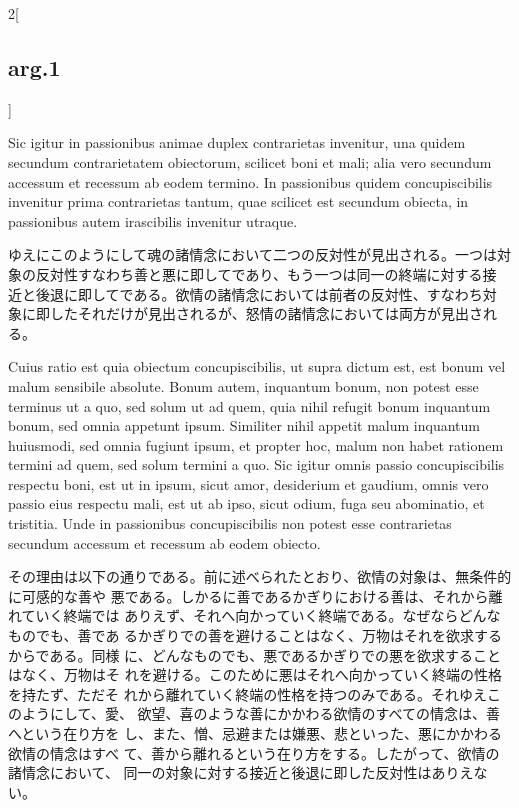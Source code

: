 \documentclass[paper=a4paper,fontsize=10pt,jafontsize=9pt,titlepage]{jlreq}
\begin{document}
\begin{paracol}{2}[\subsection{arg.1}]
\switchcolumn*

Sic igitur in passionibus animae duplex
contrarietas invenitur, una quidem secundum contrarietatem obiectorum,
scilicet boni et mali; alia vero secundum accessum et recessum ab eodem
termino. In passionibus quidem concupiscibilis invenitur prima
contrarietas tantum, quae scilicet est secundum obiecta, in passionibus
autem irascibilis invenitur utraque.

\switchcolumn

ゆえにこのようにして魂の諸情念において二つの反対性が見出される。一つは対
 象の反対性すなわち善と悪に即してであり、もう一つは同一の終端に対する接
 近と後退に即してである。欲情の諸情念においては前者の反対性、すなわち対
 象に即したそれだけが見出されるが、怒情の諸情念においては両方が見出され
 る。

\switchcolumn*

Cuius ratio est quia obiectum
concupiscibilis, ut supra dictum est, est bonum vel malum sensibile
absolute. 
Bonum autem, inquantum bonum, non potest esse terminus ut a
quo, sed solum ut ad quem, quia nihil refugit bonum inquantum bonum, sed
omnia appetunt ipsum. Similiter nihil appetit malum inquantum huiusmodi,
sed omnia fugiunt ipsum, et propter hoc, malum non habet rationem
termini ad quem, sed solum termini a quo. Sic igitur omnis passio
concupiscibilis respectu boni, est ut in ipsum, sicut amor, desiderium
et gaudium, omnis vero passio eius respectu mali, est ut ab ipso, sicut
odium, fuga seu abominatio, et tristitia. Unde in passionibus
concupiscibilis non potest esse contrarietas secundum accessum et
recessum ab eodem obiecto.

\switchcolumn

その理由は以下の通りである。前に述べられたとおり、欲情の対象は、無条件的に可感的な善や
悪である。しかるに善であるかぎりにおける善は、それから離れていく終端では
 ありえず、それへ向かっていく終端である。なぜならどんなものでも、善であ
 るかぎりでの善を避けることはなく、万物はそれを欲求するからである。同様
 に、どんなものでも、悪であるかぎりでの悪を欲求することはなく、万物はそ
 れを避ける。このために悪はそれへ向かっていく終端の性格を持たず、ただそ
 れから離れていく終端の性格を持つのみである。それゆえこのようにして、愛、
 欲望、喜のような善にかかわる欲情のすべての情念は、善へという在り方を
 し、また、憎、忌避または嫌悪、悲といった、悪にかかわる欲情の情念はすべ
 て、善から離れるという在り方をする。したがって、欲情の諸情念において、
 同一の対象に対する接近と後退に即した反対性はありえない。

\switchcolumn*


\end{paracol}
\end{document}
